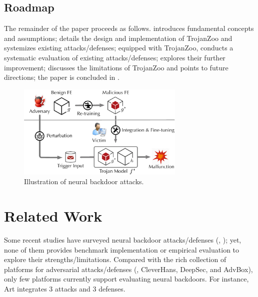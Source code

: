 \documentclass[compsoc,conference,a4paper,10pt,times]{IEEEtran}
\newcommand{\system}{{\sc \small TrojanZoo}\xspace}
\begin{document}
\subsection*{Roadmap}

The remainder of the paper proceeds as follows.  introduces fundamental concepts and assumptions;  details the design and implementation of \system and systemizes existing attacks/defenses; equipped with \system,  conducts a systematic evaluation of existing attacks/defenses;  explores their further improvement;  discusses the limitations of \system and points to future directions; the paper is concluded in .

\begin{figure}[!t]
\centering
\includegraphics[width=80mm]{figures/attack2.pdf}
\caption{Illustration of neural backdoor attacks.}
\label{fig:attack}
\end{figure}


\section{Related Work}

Some recent studies have surveyed neural backdoor attacks/defenses (\meg, ); yet, none of them provides benchmark implementation or empirical evaluation to explore their strengths/limitations. Compared with the rich collection of platforms for adversarial attacks/defenses (\meg, {\sc CleverHans}, {\sc DeepSec}, and {\sc AdvBox}), only few platforms currently support evaluating neural backdoors. For instance, {\sc Art} integrates 3 attacks and 3 defenses.
\end{document}
